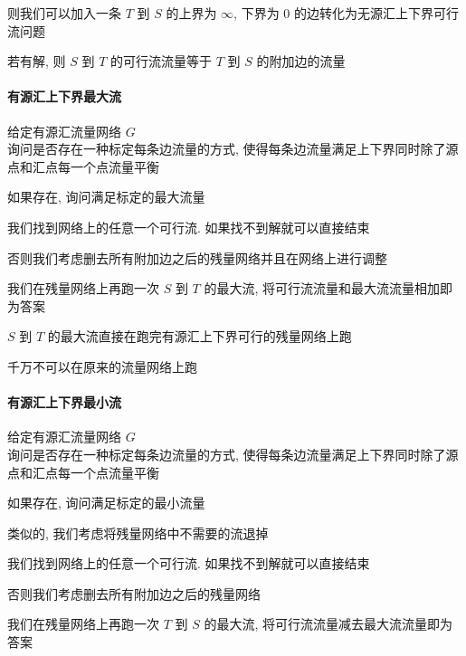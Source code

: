 则我们可以加入一条 \(T\) 到 \(S\) 的上界为 \(\infty\), 下界为 \(0\) 的边转化为无源汇上下界可行流问题

若有解, 则 \(S\) 到 \(T\) 的可行流流量等于 \(T\) 到 \(S\) 的附加边的流量

\paragraph{有源汇上下界最大流} 给定有源汇流量网络 \(G\)~\\

询问是否存在一种标定每条边流量的方式, 使得每条边流量满足上下界同时除了源点和汇点每一个点流量平衡

如果存在, 询问满足标定的最大流量

我们找到网络上的任意一个可行流. 如果找不到解就可以直接结束

否则我们考虑删去所有附加边之后的残量网络并且在网络上进行调整

我们在残量网络上再跑一次 \(S\) 到 \(T\) 的最大流, 将可行流流量和最大流流量相加即为答案

\(S\) 到 \(T\) 的最大流直接在跑完有源汇上下界可行的残量网络上跑

千万不可以在原来的流量网络上跑

\paragraph{有源汇上下界最小流} 给定有源汇流量网络 \(G\)~\\

询问是否存在一种标定每条边流量的方式, 使得每条边流量满足上下界同时除了源点和汇点每一个点流量平衡

如果存在, 询问满足标定的最小流量

类似的, 我们考虑将残量网络中不需要的流退掉

我们找到网络上的任意一个可行流. 如果找不到解就可以直接结束

否则我们考虑删去所有附加边之后的残量网络

我们在残量网络上再跑一次 \(T\) 到 \(S\) 的最大流, 将可行流流量减去最大流流量即为答案

